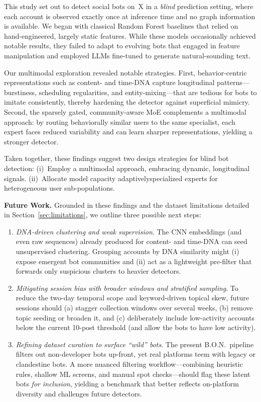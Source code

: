 \documentclass[conference]{IEEEtran}
\begin{document}
This study set out to detect social bots on~X in a \emph{blind} prediction setting, 
where each account is observed exactly once at inference time 
and no graph information is available. 
We began with classical Random Forest baselines that relied on hand-engineered, largely static features. 
While these models occasionally achieved notable results, 
they failed to adapt to evolving bots that engaged in feature manipulation and
employed LLMs fine-tuned to generate natural-sounding text. 

Our multimodal exploration revealed notable strategies. 
First, behavior‑centric representations such as content- and 
time-DNA capture longitudinal patterns---burstiness, scheduling 
regularities, and entity-mixing---that are tedious for bots to 
imitate consistently, thereby hardening the detector against 
superficial mimicry. Second, the sparsely gated, community‑aware 
MoE complements a multimodal approach: by routing behaviorally similar users to the same specialist, 
each expert faces reduced variability and can learn sharper representations, 
yielding a stronger detector.

Taken together, these findings suggest two design strategies 
for blind bot detection: (i)~Employ a multimodal approach, embracing dynamic, longitudinal signals. 
(ii)~Allocate model capacity adaptively\textemdash{}specialized experts for heterogeneous user sub-populations.

\textbf{Future Work.}  
Grounded in these findings and the dataset limitations detailed in
Section~\ref{sec:limitations}, we outline three possible next steps:

\begin{enumerate}
  \item \emph{DNA-driven clustering and weak supervision}.  
        The CNN embeddings (and even raw sequences) already produced for content- and time-DNA can seed
        unsupervised clustering.  Grouping accounts by DNA similarity might  
        (i) expose emergent bot communities and (ii) act as a lightweight pre-filter that
        forwards only suspicious clusters to heavier detectors.

  \item \emph{Mitigating session bias with broader windows and stratified sampling}.  
        To reduce the two-day temporal scope and keyword-driven topical skew,
        future sessions should (a) stagger collection windows over several weeks,
        (b) remove topic seeding or broaden it, and
        (c) deliberately include low-activity accounts below the current 10-post
        threshold (and allow the bots to have low activity).  

  \item \emph{Refining dataset curation to surface “wild” bots}.  
        The present B.O.N.\ pipeline filters out non-developer bots up-front,
        yet real platforms teem with legacy or clandestine bots.  A more
        nuanced filtering workflow—combining heuristic rules, shallow ML screens,
        and manual spot checks—should flag these latent bots \emph{for inclusion},
        yielding a benchmark that better reflects on-platform diversity and
        challenges future detectors. 
\end{enumerate}
\end{document}
